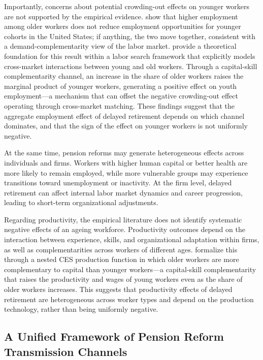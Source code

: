 \documentclass[11pt,english,a4paper, twoside, authoryear]{article}
\begin{document}
Importantly, concerns about potential crowding-out effects on younger workers are not supported by the empirical evidence. \citet{MunnellWu2012} show that higher employment among older workers does not reduce employment opportunities for younger cohorts in the United States; if anything, the two move together, consistent with a demand-complementarity view of the labor market. \citet{Dai2022} provide a theoretical foundation for this result within a labor search framework that explicitly models cross-market interactions between young and old workers. Through a capital-skill complementarity channel, an increase in the share of older workers raises the marginal product of younger workers, generating a positive effect on youth employment---a mechanism that can offset the negative crowding-out effect operating through cross-market matching. These findings suggest that the aggregate employment effect of delayed retirement depends on which channel dominates, and that the sign of the effect on younger workers is not uniformly negative.

At the same time, pension reforms may generate heterogeneous effects across individuals and firms. Workers with higher human capital or better health are more likely to remain employed, while more vulnerable groups may experience transitions toward unemployment or inactivity. At the firm level, delayed retirement can affect internal labor market dynamics and career progression, leading to short-term organizational adjustments.

Regarding productivity, the empirical literature does not identify systematic negative effects of an ageing workforce. Productivity outcomes depend on the interaction between experience, skills, and organizational adaptation within firms, as well as complementarities across workers of different ages. \citet{Dai2022} formalize this through a nested CES production function in which older workers are more complementary to capital than younger workers---a capital-skill complementarity that raises the productivity and wages of young workers even as the share of older workers increases. This suggests that productivity effects of delayed retirement are heterogeneous across worker types and depend on the production technology, rather than being uniformly negative.


\subsection{A Unified Framework of Pension Reform Transmission Channels}
\end{document}
